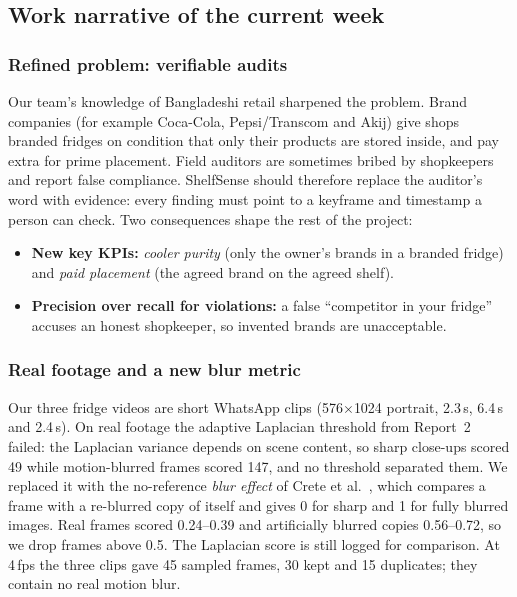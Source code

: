 \subsection{Work narrative of the current week}

\subsubsection{Refined problem: verifiable audits}
Our team's knowledge of Bangladeshi retail sharpened the problem. Brand companies (for example
Coca-Cola, Pepsi/Transcom and Akij) give shops branded fridges on condition that only their
products are stored inside, and pay extra for prime placement. Field auditors are sometimes bribed
by shopkeepers and report false compliance. ShelfSense should therefore replace the auditor's word
with evidence: every finding must point to a keyframe and timestamp a person can check. Two
consequences shape the rest of the project:
\begin{itemize}
  \item \textbf{New key KPIs:} \emph{cooler purity} (only the owner's brands in a branded fridge)
  and \emph{paid placement} (the agreed brand on the agreed shelf).
  \item \textbf{Precision over recall for violations:} a false ``competitor in your fridge''
  accuses an honest shopkeeper, so invented brands are unacceptable.
\end{itemize}

\subsubsection{Real footage and a new blur metric}
Our three fridge videos are short WhatsApp clips (576$\times$1024 portrait, 2.3\,s, 6.4\,s and
2.4\,s). On real footage the adaptive Laplacian threshold from Report~2 failed: the Laplacian
variance depends on scene content, so sharp close-ups scored 49 while motion-blurred frames scored
147, and no threshold separated them. We replaced it with the no-reference \emph{blur effect}
of Crete et al.\ \cite{crete2007blur}, which compares a frame with a re-blurred copy of itself and
gives 0 for sharp and 1 for fully blurred images. Real frames scored 0.24--0.39 and artificially
blurred copies 0.56--0.72, so we drop frames above 0.5. The Laplacian score is still logged for
comparison. At 4\,fps the three clips gave 45 sampled frames, 30 kept and 15 duplicates; they
contain no real motion blur.

